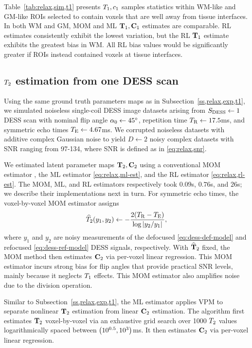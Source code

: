 Table~\ref{tab:relax,sim,t1} presents
$T_1,c_{1}$ samples statistics
within WM-like and GM-like ROIs
selected to contain voxels
that are well away from tissue interfaces. 
In both WM and GM,
MOM and ML $\mathbf{T}_1,\mathbf{C}_{1}$ estimates are comparable.
RL estimates consistently exhibit
the lowest variation,
but the RL $\mathbf{T}_1$ estimate
exhibits the greatest bias in WM.
All RL bias values would be significantly greater
if ROIs instead contained voxels at tissue interfaces.

\subsection{$T_2$ estimation from one DESS scan}
\label{ss,relax,exp,t2}

Using the same ground truth parameters maps
as in Subsection~\ref{ss,relax,exp,t1},
we simulated noiseless single-coil DESS image datasets
arising from $S_{\mathrm{DESS}} \gets 1$ DESS scan
with nominal flip angle $\alpha_0 \gets 45^{\circ}$,
repetition time $T_\mathrm{R} \gets 17.5$ms,
and symmetric echo times $T_\mathrm{E} \gets 4.67$ms.
We corrupted noiseless datasets
with additive complex Gaussian noise 
to yield $D \gets 2$ noisy complex datasets
with SNR ranging from 97-134,
where SNR is defined as in \eqref{eq:relax,snr}.

We estimated latent parameter maps $\mathbf{T}_2, \mathbf{C}_{2}$ 
using a conventional MOM estimator \cite{bruder:88:ans},
the ML estimator \eqref{eq:relax,ml-est},
and the RL estimator \eqref{eq:relax,rl-est}.
The MOM, ML, and RL estimators 
respectively took $0.09$s, $0.76$s, and $26$s;
we describe their implementations next in turn.
For symmetric echo times,
the voxel-by-voxel MOM estimator assigns
\begin{align}
	\est{T}_2\paren{y_1,y_2} \gets -\frac{2\paren{\TR-\TE}}{\log{\abs{y_2/y_1}}},
	\label{eq:relax,dess,mom}
\end{align}
where $y_1$ and $y_2$ are noisy measurements
of the defocused \eqref{eq:dess-def-model}
and refocused \eqref{eq:dess-ref-model} DESS signals,
respectively.
With $\widehat{\mathbf{T}}_2$ fixed,
the MOM method then estimates $\mathbf{C}_{2}$ 
via per-voxel linear regression.
This MOM estimator incurs strong bias
for flip angles 
that provide practical SNR levels,
mainly because it neglects $T_1$ effects.
This MOM estimator also amplifies noise 
due to the division operation.

Similar to Subsection~\ref{ss,relax,exp,t1},
the ML estimator applies VPM
to separate nonlinear $\mathbf{T}_2$ estimation
from linear $\mathbf{C}_{2}$ estimation.
The algorithm first estimates $\mathbf{T}_2$ voxel-by-voxel
via an exhaustive grid search
over 1000 $T_2$ values
logarithmically spaced between $\paren{10^{0.5},10^3}$ms.
It then estimates $\mathbf{C}_{2}$ 
via per-voxel linear regression.

